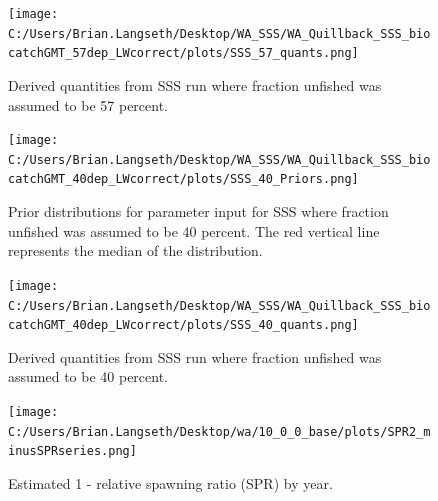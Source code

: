 \documentclass[11pt,
  english,
  letterpaper,
]{article}
\begin{document}
\begin{figure}
\centering
\texttt{[image: C:/Users/Brian.Langseth/Desktop/WA\_SSS/WA\_Quillback\_SSS\_biocatchGMT\_57dep\_LWcorrect/plots/SSS\_57\_quants.png]}
\caption{Derived quantities from SSS run where fraction unfished was assumed to be 57 percent.\label{fig:sss-quant-57}}
\end{figure}

\tagmcend\tagstructend

\newpage


\begin{figure}
\centering
\texttt{[image: C:/Users/Brian.Langseth/Desktop/WA\_SSS/WA\_Quillback\_SSS\_biocatchGMT\_40dep\_LWcorrect/plots/SSS\_40\_Priors.png]}
\caption{Prior distributions for parameter input for SSS where fraction unfished was assumed to be 40 percent. The red vertical line represents the median of the distribution.\label{fig:sss-prior-40}}
\end{figure}

\tagmcend\tagstructend

\newpage


\begin{figure}
\centering
\texttt{[image: C:/Users/Brian.Langseth/Desktop/WA\_SSS/WA\_Quillback\_SSS\_biocatchGMT\_40dep\_LWcorrect/plots/SSS\_40\_quants.png]}
\caption{Derived quantities from SSS run where fraction unfished was assumed to be 40 percent.\label{fig:sss-quant-40}}
\end{figure}

\tagmcend\tagstructend


\begin{figure}
\centering
\texttt{[image: C:/Users/Brian.Langseth/Desktop/wa/10\_0\_0\_base/plots/SPR2\_minusSPRseries.png]}
\caption{Estimated 1 - relative spawning ratio (SPR) by year.\label{fig:1-spr}}
\end{figure}
\end{document}
